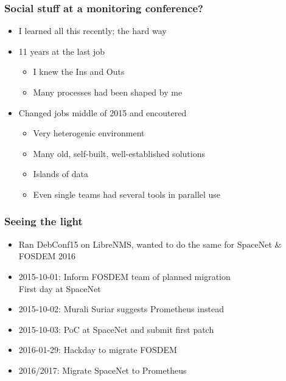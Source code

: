 \documentclass[t]{beamer}
\begin{document}
\begin{frame}
	\frametitle{Social stuff at a monitoring conference?}
	\begin{itemize}
		\item I learned all this recently; the hard way
		\item 11 years at the last job
		\begin{itemize}
			\item I knew the Ins and Outs
			\item Many processes had been shaped by me
		\end{itemize}
		\item Changed jobs middle of 2015 and encoutered
		\begin{itemize}
			\item Very heterogenic environment
			\item Many old, self-built, well-established solutions
			\item Islands of data
			\item Even single teams had several tools in parallel use
		\end{itemize}
	\end{itemize}
\end{frame}


\begin{frame}
	\frametitle{Seeing the light}
	\begin{itemize}
		\item Ran DebConf15 on LibreNMS, wanted to do the same for SpaceNet \& FOSDEM 2016
		\item 2015-10-01: Inform FOSDEM team of planned migration \\
			\qquad \qquad First day at SpaceNet
		\item 2015-10-02: Murali Suriar suggests Prometheus instead
		\item 2015-10-03: PoC at SpaceNet and submit first patch
		\item 2016-01-29: Hackday to migrate FOSDEM
		\item 2016/2017: Migrate SpaceNet to Prometheus
	\end{itemize}
\end{frame}
\end{document}
